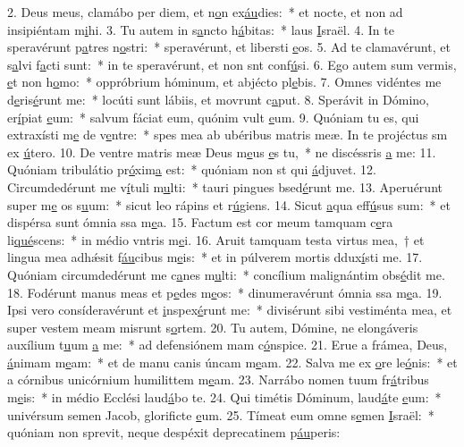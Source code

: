 2. Deus meus, clamábo per diem, et n\uline{o}n ex\uline{áu}dies:~* et nocte, et non ad insipiéntam m\uline{i}hi.
3. Tu autem in s\uline{a}ncto h\uline{á}bitas:~* laus \uline{I}sraël.
4. In te speravérunt p\uline{a}tres n\uline{o}stri:~* speravérunt, et libersti \uline{e}os.
5. Ad te clamavérunt, et s\uline{a}lvi f\uline{a}cti sunt:~* in te speravérunt, et non snt conf\uline{ú}si.
6. Ego autem sum vermis, \uline{e}t non h\uline{o}mo:~* oppróbrium hóminum, et abjécto pl\uline{e}bis.
7. Omnes vidéntes me d\uline{e}ris\uline{é}runt me:~* locúti sunt lábiis, et movrunt c\uline{a}put.
8. Sperávit in Dómino, er\uline{í}piat \uline{e}um:~* salvum fáciat eum, quónim vult \uline{e}um.
9. Quóniam tu es, qui extraxísti m\uline{e} de v\uline{e}ntre:~* spes mea ab ubéribus matris meæ. In te projéctus sm ex \uline{ú}tero.
10. De ventre matris meæ Deus m\uline{e}us \uline{e}s tu,~* ne discéssris \uline{a} me:
11. Quóniam tribulátio pr\uline{ó}xim\uline{a} est:~* quóniam non st qui \uline{á}djuvet.
12. Circumdedérunt me v\uline{í}tuli m\uline{u}lti:~* tauri pingues bsed\uline{é}runt me.
13. Aperuérunt super m\uline{e} os s\uline{u}um:~* sicut leo rápins et r\uline{ú}giens.
14. Sicut \uline{a}qua eff\uline{ú}sus sum:~* et dispérsa sunt ómnia ssa m\uline{e}a.
15. Factum est cor meum tamquam c\uline{e}ra li\uline{qué}scens:~* in médio vntris m\uline{e}i.
16. Aruit tamquam testa virtus mea,~† et lingua mea adhǽsit f\uline{áu}cibus m\uline{e}is:~* et in púlverem mortis ddux\uline{í}sti me.
17. Quóniam circumdedérunt me c\uline{a}nes m\uline{u}lti:~* concílium malignántim obs\uline{é}dit me.
18. Fodérunt manus meas et p\uline{e}des m\uline{e}os:~* dinumeravérunt ómnia ssa m\uline{e}a.
19. Ipsi vero consíderavérunt et \uline{i}nspex\uline{é}runt me:~* divisérunt sibi vestiménta mea, et super vestem meam misrunt s\uline{o}rtem.
20. Tu autem, Dómine, ne elongáveris auxílium t\uline{u}um \uline{a} me:~* ad defensiónem mam c\uline{ó}nspice.
21. Erue a frámea, Deus, \uline{á}nimam m\uline{e}am:~* et de manu canis úncam m\uline{e}am.
22. Salva me ex \uline{o}re le\uline{ó}nis:~* et a córnibus unicórnium humilittem m\uline{e}am.
23. Narrábo nomen tuum fr\uline{á}tribus m\uline{e}is:~* in médio Ecclési laud\uline{á}bo te.
24. Qui timétis Dóminum, laud\uline{á}te \uline{e}um:~* univérsum semen Jacob, glorificte \uline{e}um.
25. Tímeat eum omne s\uline{e}men \uline{I}sraël:~* quóniam non sprevit, neque despéxit deprecatinem p\uline{áu}peris:
